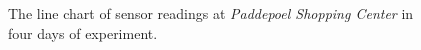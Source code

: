 \begin{figure}[H]
\begin{adjustwidth}{-5cm}{}
{{    }
  }
  \end{adjustwidth}
  \caption[The line chart of sensor readings at Paddepoel Shopping Center.]
  {The line chart of sensor readings at \textit{Paddepoel Shopping Center} in four days of experiment.}
  \label{fig:result-paddepoel-line-chart}
\end{figure}


